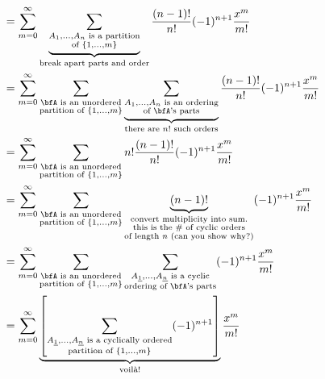 \documentclass{article}
\begin{document}
\begin{align*}
    &=
    \sum_{m=0}^\infty
    \underbrace{
        \sum_{
            \substack{
                A_1,\ldots,A_n \text{ is a partition} \\
                \text{of }\{1,\ldots,m\}
            }
        }
    }_{\text{break apart parts and order}}
    \frac{(n-1)!}{n!}
    (-1)^{n+1}
    \frac{x^m}{m!}
    \\
    &=
    \sum_{m=0}^\infty
    \sum_{
        \substack{
            \bfA \text{ is an unordered} \\
            \text{partition of }\{1,\ldots,m\}
        }
    }
    \underbrace{
        \sum_{
            \substack{
                A_1,\ldots,A_n \text{ is an ordering} \\
                \text{of $\bfA$'s parts}
            }
        }
    }_{\text{there are $n!$ such orders}}
    \frac{(n-1)!}{n!}
    (-1)^{n+1}
    \frac{x^m}{m!}
    \\
    &=
    \sum_{m=0}^\infty
    \sum_{
        \substack{
            \bfA \text{ is an unordered} \\
            \text{partition of }\{1,\ldots,m\}
        }
    }
    n!
    \frac{(n-1)!}{n!}
    (-1)^{n+1}
    \frac{x^m}{m!}
    \\
    &=
    \sum_{m=0}^\infty
    \sum_{
        \substack{
            \bfA \text{ is an unordered} \\
            \text{partition of }\{1,\ldots,m\}
        }
    }
    \underbrace{
        (n-1)!
    }_{
        \substack{
            \text{convert multiplicity into sum.} \\
            \text{this is the \# of cyclic orders} \\
            \text{of length $n$ (can you show why?)}
        }
    }
    (-1)^{n+1}
    \frac{x^m}{m!}
    \\
    &=
    \sum_{m=0}^\infty
    \sum_{
        \substack{
            \bfA \text{ is an unordered} \\
            \text{partition of }\{1,\ldots,m\}
        }
    }
    \sum_{
        \substack{
            A_{\underline{1}},\ldots,A_{\underline{n}}\text{ is a cyclic} \\
            \text{ordering of $\bfA$'s parts}
        }
    }
    (-1)^{n+1}
    \frac{x^m}{m!}
    \\
    &=
    \sum_{m=0}^\infty
    \underbrace{
        \left[
            \sum_{
                \substack{
                    A_{\underline{1}},\ldots,A_{\underline{n}} \text{ is a cyclically ordered} \\
                    \text{partition of }\{1,\ldots,m\}
                }
            }
            (-1)^{n+1}
        \right]
    }_{\text{voil\`a!}}
    \frac{x^m}{m!}
\end{align*}
\end{document}
